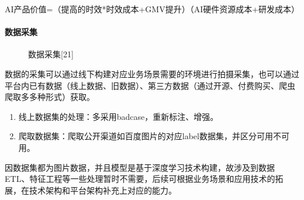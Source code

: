 \documentclass[letterpaper,10pt,english]{sphinxmanual}
\begin{document}
AI产品价值=（提高的时效*时效成本+GMV提升）\sphinxhyphen{}（AI硬件资源成本+研发成本）


\paragraph{数据采集}
\label{\detokenize{chapter_idea/data:id12}}
\begin{figure}[H]
\centering
\capstart

\noindent{}
\caption{数据采集{[}21{]}}\label{\detokenize{chapter_idea/data:id28}}\end{figure}

数据的采集可以通过线下构建对应业务场景需要的环境进行拍摄采集，也可以通过平台内已有数据（线上数据、旧数据）、第三方数据（通过开源、付费购买、爬虫爬取多多种形式）获取。
\begin{enumerate}
%
\item {} 
线上数据集的处理：多采用badcase，重新标注、增强。

\item {} 
爬取数据集：爬取公开渠道如百度图片的对应label数据集，并区分可用不可用。

\end{enumerate}

因数据集都为图片数据，并且模型是基于深度学习技术构建，故涉及到数据ETL、特征工程等一些处理暂时不需要，后续可根据业务场景和应用技术的拓展，在技术架构和平台架构补充上对应的能力。
\end{document}
